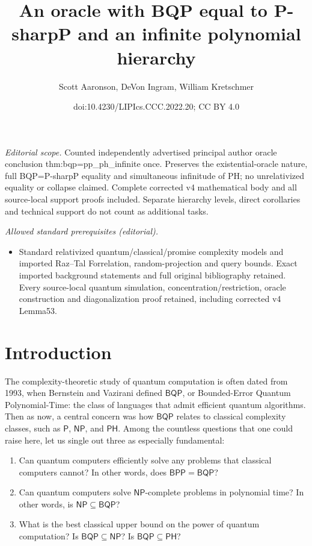 \documentclass[10pt,a4paper]{article}
\title{An oracle with BQP equal to P-sharpP and an infinite polynomial hierarchy}
\author{Scott Aaronson, DeVon Ingram, William Kretschmer}
\date{doi:10.4230/LIPIcs.CCC.2022.20; CC BY 4.0}
\begin{document}
\maketitle
\noindent\textit{Editorial scope.} Counted independently advertised principal author oracle conclusion thm:bqp=pp\_ph\_infinite once. Preserves the existential-oracle nature, full BQP=P-sharpP equality and simultaneous infinitude of PH; no unrelativized equality or collapse claimed. Complete corrected v4 mathematical body and all source-local support proofs included. Separate hierarchy levels, direct corollaries and technical support do not count as additional tasks.\par\medskip
\noindent\textit{Allowed standard prerequisites (editorial).}\begin{itemize}
\item Standard relativized quantum/classical/promise complexity models and imported Raz–Tal Forrelation, random-projection and query bounds. Exact imported background statements and full original bibliography retained. Every source-local quantum simulation, concentration/restriction, oracle construction and diagonalization proof retained, including corrected v4 Lemma53.
\end{itemize}\medskip
\section{Introduction\label{INTRO}}

The complexity-theoretic study of quantum computation is often dated from 1993, when Bernstein and Vazirani \cite{BV97} defined $\mathsf{BQP}$, or Bounded-Error Quantum Polynomial-Time: the class of languages that admit efficient quantum algorithms.  Then as now, a central concern was how $\mathsf{BQP}$ relates to classical complexity classes, such as $\mathsf{P}$, $\mathsf{NP}$, and $\mathsf{PH}$.  Among the countless questions that one could raise here, let us single out three as especially fundamental:
\begin{enumerate}[(1)]
\item Can quantum computers efficiently solve any problems that classical computers cannot?  In other words, does $\mathsf{BPP}= \mathsf{BQP}$?
\item Can quantum computers solve $\mathsf{NP}$-complete problems in polynomial time?  In other words, is $\mathsf{NP} \subseteq \mathsf{BQP}$?
\item What is the best classical upper bound on the power of quantum computation?  Is $\mathsf{BQP} \subseteq \mathsf{NP}$?  Is $\mathsf{BQP} \subseteq \mathsf{PH}$?
\end{enumerate}
\end{document}
